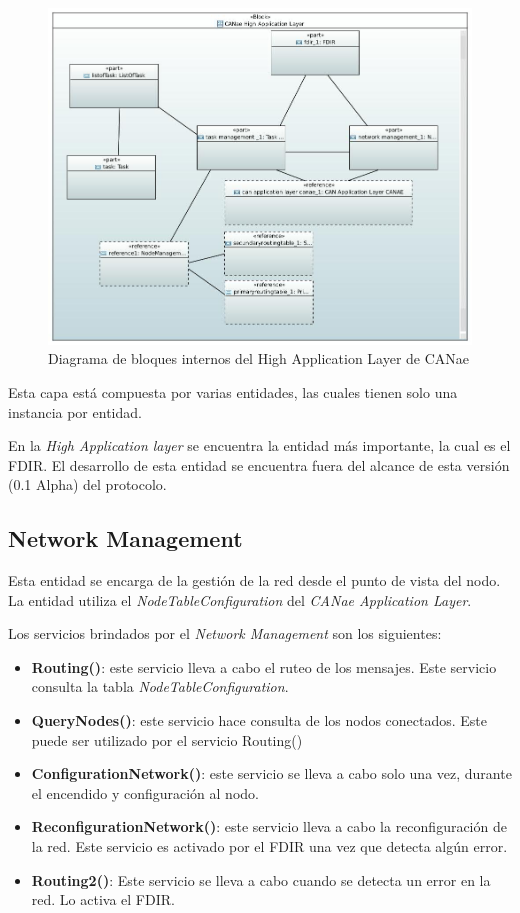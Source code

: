 \begin{figure}[h!]
 \centering
 \includegraphics[scale=0.4]{images/Secciones/AppendixA/Internal_CAN_High_Application_Layer.JPG}
  \caption{Diagrama de bloques internos del High Application Layer de CANae}
\label{fig:HighAppLayerInternalBlock}
\end{figure}

Esta capa está compuesta por varias entidades, las cuales tienen solo una
instancia por entidad.

En la \textit{High Application layer} se encuentra la entidad más importante, la
cual es el \ac{FDIR}. El desarrollo de esta entidad se encuentra fuera del
alcance de esta versión (0.1 Alpha) del protocolo.

\subsection{Network Management}
Esta entidad se encarga de la gestión de la red desde el punto de vista del
nodo. La entidad utiliza el \textit{NodeTableConfiguration} del
\textit{CANae Application Layer}.

Los servicios brindados por el \textit{Network Management} son los siguientes:
\begin{itemize}
\item \textbf{Routing()}: este servicio lleva a cabo el ruteo de los mensajes.
  Este servicio consulta la tabla \textit{NodeTableConfiguration}.
\item \textbf{QueryNodes()}: este servicio hace consulta de los nodos
  conectados. Este puede ser utilizado por el servicio Routing()
\item \textbf{ConfigurationNetwork()}: este servicio se lleva a cabo solo una
  vez, durante el encendido y configuración al nodo. 
\item \textbf{ReconfigurationNetwork()}: este servicio lleva a cabo la
  reconfiguración de la red. Este servicio es activado por el \ac{FDIR} una vez
  que detecta algún error.
\item \textbf{Routing2()}: Este servicio se lleva a cabo cuando se detecta un
  error en la red. Lo activa el \ac{FDIR}. 
\end{itemize}

